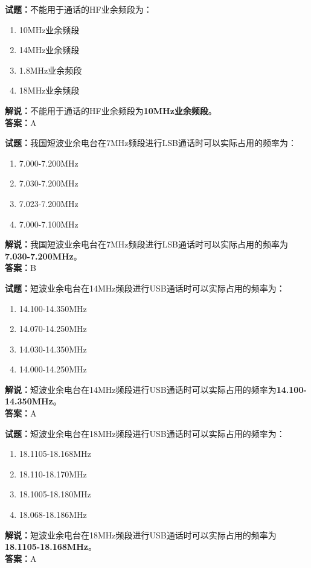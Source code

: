 \documentclass{ctexbook}
\begin{document}
\vspace{1em}

\textbf{试题：}不能用于通话的HF业余频段为：
\begin{enumerate}[leftmargin=3em]
  \item 10\unit{\MHz}业余频段
  \item 14\unit{\MHz}业余频段
  \item 1.8\unit{\MHz}业余频段
  \item 18\unit{\MHz}业余频段
\end{enumerate}
\noindent\textbf{解说：}不能用于通话的HF业余频段为\textbf{10\unit{\MHz}业余频段}。\\\noindent\textbf{答案：}A

\vspace{1em}

\textbf{试题：}我国短波业余电台在7\unit{\MHz}频段进行LSB通话时可以实际占用的频率为：
\begin{enumerate}[leftmargin=3em]
  \item 7.000-7.200\unit{\MHz}
  \item 7.030-7.200\unit{\MHz}
  \item 7.023-7.200\unit{\MHz}
  \item 7.000-7.100\unit{\MHz}
\end{enumerate}
\noindent\textbf{解说：}我国短波业余电台在7\unit{\MHz}频段进行LSB通话时可以实际占用的频率为\textbf{7.030-7.200\unit{\MHz}}。\\\noindent\textbf{答案：}B

\vspace{1em}

\textbf{试题：}短波业余电台在14\unit{\MHz}频段进行USB通话时可以实际占用的频率为：
\begin{enumerate}[leftmargin=3em]
  \item 14.100-14.350\unit{\MHz}
  \item 14.070-14.250\unit{\MHz}
  \item 14.030-14.350\unit{\MHz}
  \item 14.000-14.250\unit{\MHz}
\end{enumerate}
\noindent\textbf{解说：}短波业余电台在14\unit{\MHz}频段进行USB通话时可以实际占用的频率为\textbf{14.100-14.350\unit{\MHz}}。\\\noindent\textbf{答案：}A

\vspace{1em}

\textbf{试题：}短波业余电台在18\unit{\MHz}频段进行USB通话时可以实际占用的频率为：
\begin{enumerate}[leftmargin=3em]
  \item 18.1105-18.168\unit{\MHz}
  \item 18.110-18.170\unit{\MHz}
  \item 18.1005-18.180\unit{\MHz}
  \item 18.068-18.186\unit{\MHz}
\end{enumerate}
\noindent\textbf{解说：}短波业余电台在18\unit{\MHz}频段进行USB通话时可以实际占用的频率为\textbf{18.1105-18.168\unit{\MHz}}。\\\noindent\textbf{答案：}A
\end{document}
